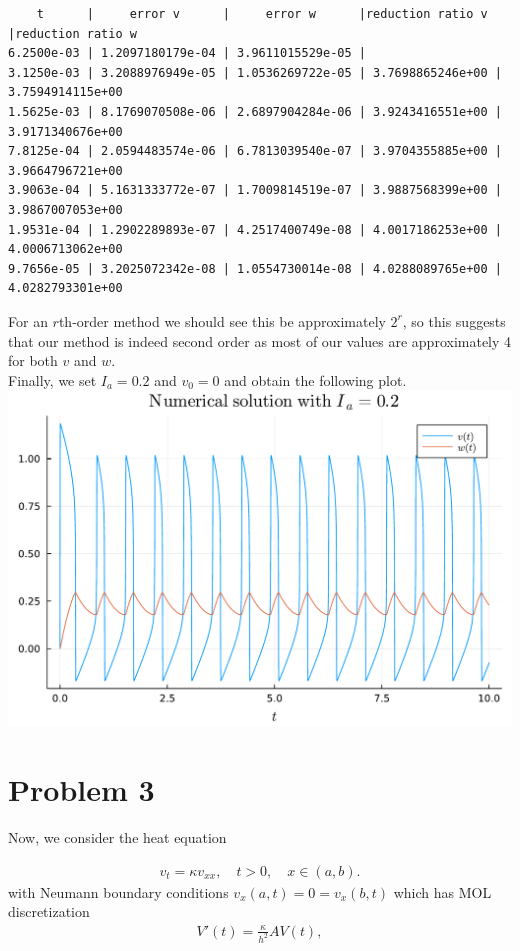 \documentclass{article}
\begin{document}
\begin{verbatim}
    t      |     error v      |     error w      |reduction ratio v |reduction ratio w
6.2500e-03 | 1.2097180179e-04 | 3.9611015529e-05 |
3.1250e-03 | 3.2088976949e-05 | 1.0536269722e-05 | 3.7698865246e+00 | 3.7594914115e+00
1.5625e-03 | 8.1769070508e-06 | 2.6897904284e-06 | 3.9243416551e+00 | 3.9171340676e+00
7.8125e-04 | 2.0594483574e-06 | 6.7813039540e-07 | 3.9704355885e+00 | 3.9664796721e+00
3.9063e-04 | 5.1631333772e-07 | 1.7009814519e-07 | 3.9887568399e+00 | 3.9867007053e+00
1.9531e-04 | 1.2902289893e-07 | 4.2517400749e-08 | 4.0017186253e+00 | 4.0006713062e+00
9.7656e-05 | 3.2025072342e-08 | 1.0554730014e-08 | 4.0288089765e+00 | 4.0282793301e+00
\end{verbatim}
For an $r$th-order method we should see this be approximately $2^r$, so this suggests that our method is indeed second order as most of our values are approximately 4 for both $v$ and $w$.\\
Finally, we set $I_a=0.2$ and $v_0=0$ and obtain the following plot.\\
\includegraphics[scale=0.5]{prob2c.pdf}

\section{Problem 3}
Now, we consider the heat equation

\begin{align*}
	v_t = \kappa v_{xx}, \quad t > 0,\quad x \in (a,b).
\end{align*}
with Neumann boundary conditions \(v_x(a,t) = 0 = v_x(b,t)\) which has MOL discretization
\begin{align*}
	V'(t) = \frac{\kappa}{h^2} A V(t),
\end{align*}
\end{document}
